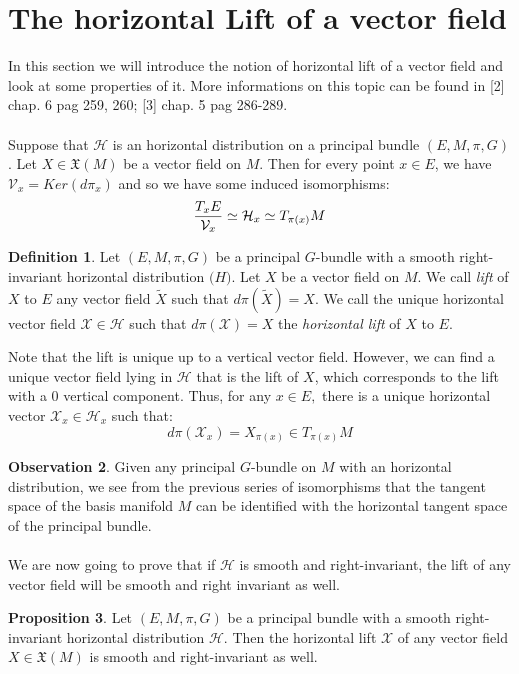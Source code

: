 \documentclass[12pt,a4paper]{report}
\theoremstyle{definition}
\newtheorem{Def}{Definition}[chapter]
\theoremstyle{Theorem}
\newtheorem{Prop}[Def]{Proposition}
\theoremstyle{definition}
\theoremstyle{definition}
\newtheorem{Obs}[Def]{Observation}
\begin{document}
	\section{The horizontal Lift of a vector field}
	In this section we will introduce the notion of horizontal lift of a vector field and look at some properties of it. More informations on this topic can be found in [2] chap. 6 pag 259, 260; [3] chap. 5 pag 286-289.\\
	\\
	Suppose that $\mathcal{H}$ is an horizontal distribution on a principal bundle $(E,M,\pi,G)$. Let $X\in\mathfrak{X}(M)$ be a vector field on $M$. Then for every point $x\in E$, we have $\mathcal{V}_{x}=Ker(d\pi_{x})$ and so we have some induced isomorphisms:
	$${T_{x}E\over \mathcal{V}_{x}}\simeq \mathcal{H}_{x}\simeq T_{\pi(x)}M$$
	\begin{Def}
		Let $(E,M,\pi,G)$ be a principal $G$-bundle with a smooth right-invariant horizontal distribution $\mathcal(H)$. Let $X$ be a vector field on $M$. We call \textit{lift} of $X$ to $E$ any vector field $\tilde{X}$ such that $d\pi(\tilde{X})=X$. We call the unique horizontal vector field $\mathcal{X}\in \mathcal{H}$ such that $d\pi(\mathcal{X})=X$ the \textit{horizontal lift} of $X$ to $E$.
	\end{Def}
	Note that the lift is unique up to a vertical vector field. However, we can find a unique vector field lying in $\mathcal{H}$ that is the lift of $X$, which corresponds to the lift with a 0 vertical component.
	Thus, for any $x\in E,$ there is a unique horizontal vector $\mathcal{X}_{x}\in\mathcal{H}_{x}$ such that:
	$$d\pi(\mathcal{X}_{x})=X_{\pi(x)}\in T_{\pi(x)}M$$
	\begin{Obs}
		Given any principal $G$-bundle on $M$ with an horizontal distribution, we see from the previous series of isomorphisms that the tangent space of the basis manifold $M$ can be identified with the horizontal tangent space of the principal bundle.\\
		\\
		We are now going to prove that if $\mathcal{H}$ is smooth and right-invariant, the lift of any vector field will be smooth and right invariant as well.
	\end{Obs}
	\begin{Prop}
		Let $(E,M,\pi,G)$ be a principal bundle with a smooth right-invariant horizontal distribution $\mathcal{H}$. Then the horizontal lift $\mathcal{X}$ of any vector field $X\in\mathfrak{X}(M)$ is smooth and right-invariant as well.
	\end{Prop}
\end{document}
